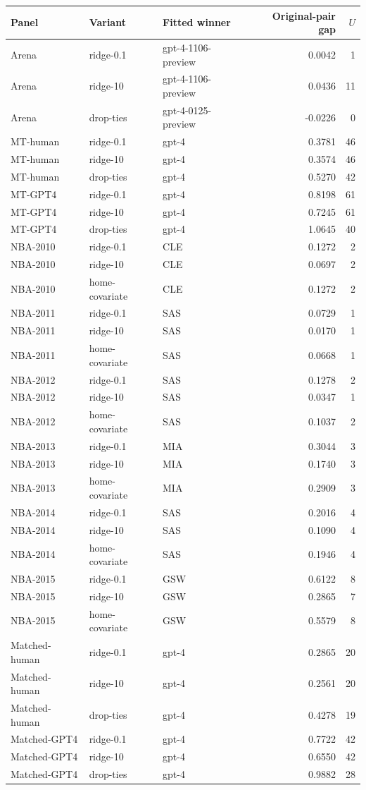 \begin{tabular}{lllrr}
\toprule
Panel & Variant & Fitted winner & Original-pair gap & $U$ \\
\midrule
Arena & ridge-0.1 & gpt-4-1106-preview & 0.0042 & 1 \\
Arena & ridge-10 & gpt-4-1106-preview & 0.0436 & 11 \\
Arena & drop-ties & gpt-4-0125-preview & -0.0226 & 0 \\
MT-human & ridge-0.1 & gpt-4 & 0.3781 & 46 \\
MT-human & ridge-10 & gpt-4 & 0.3574 & 46 \\
MT-human & drop-ties & gpt-4 & 0.5270 & 42 \\
MT-GPT4 & ridge-0.1 & gpt-4 & 0.8198 & 61 \\
MT-GPT4 & ridge-10 & gpt-4 & 0.7245 & 61 \\
MT-GPT4 & drop-ties & gpt-4 & 1.0645 & 40 \\
NBA-2010 & ridge-0.1 & CLE & 0.1272 & 2 \\
NBA-2010 & ridge-10 & CLE & 0.0697 & 2 \\
NBA-2010 & home-covariate & CLE & 0.1272 & 2 \\
NBA-2011 & ridge-0.1 & SAS & 0.0729 & 1 \\
NBA-2011 & ridge-10 & SAS & 0.0170 & 1 \\
NBA-2011 & home-covariate & SAS & 0.0668 & 1 \\
NBA-2012 & ridge-0.1 & SAS & 0.1278 & 2 \\
NBA-2012 & ridge-10 & SAS & 0.0347 & 1 \\
NBA-2012 & home-covariate & SAS & 0.1037 & 2 \\
NBA-2013 & ridge-0.1 & MIA & 0.3044 & 3 \\
NBA-2013 & ridge-10 & MIA & 0.1740 & 3 \\
NBA-2013 & home-covariate & MIA & 0.2909 & 3 \\
NBA-2014 & ridge-0.1 & SAS & 0.2016 & 4 \\
NBA-2014 & ridge-10 & SAS & 0.1090 & 4 \\
NBA-2014 & home-covariate & SAS & 0.1946 & 4 \\
NBA-2015 & ridge-0.1 & GSW & 0.6122 & 8 \\
NBA-2015 & ridge-10 & GSW & 0.2865 & 7 \\
NBA-2015 & home-covariate & GSW & 0.5579 & 8 \\
Matched-human & ridge-0.1 & gpt-4 & 0.2865 & 20 \\
Matched-human & ridge-10 & gpt-4 & 0.2561 & 20 \\
Matched-human & drop-ties & gpt-4 & 0.4278 & 19 \\
Matched-GPT4 & ridge-0.1 & gpt-4 & 0.7722 & 42 \\
Matched-GPT4 & ridge-10 & gpt-4 & 0.6550 & 42 \\
Matched-GPT4 & drop-ties & gpt-4 & 0.9882 & 28 \\
\bottomrule
\end{tabular}
